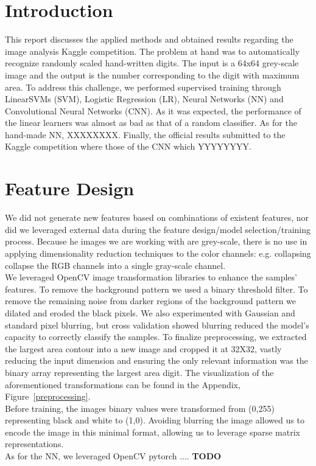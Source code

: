 \documentclass[10pt, hidelinks]{article}
\begin{document}
\section*{Introduction}

This report discusses the applied methods and obtained results regarding the image analysis Kaggle competition. The problem at hand was to automatically recognize randomly scaled hand-written digits. The input is a 64x64 grey-scale image and the output is the number corresponding to the digit with maximum area. To address this challenge, we performed supervised training through LinearSVMs (SVM), Logistic Regression (LR), Neural Networks (NN) and Convolutional Neural Networks (CNN). As it was expected, the performance of the linear learners was almost as bad as that of a random classifier. As for the hand-made NN, XXXXXXXX. Finally, the official results submitted to the Kaggle competition where those of the CNN which YYYYYYYY.

\section*{Feature Design}


We did not generate new features based on combinations of existent features, nor did we leveraged external data during the feature design/model selection/training process. Because he images we are working with are grey-scale, there is no use in applying dimensionality reduction techniques to the color channels: e.g. collapsing collapse the RGB channels into a single gray-scale channel.\\
\noindent We leveraged OpenCV image transformation libraries to enhance the samples' features. To remove the background pattern we used a binary threshold filter. To remove the remaining noise from darker regions of the background pattern we dilated and eroded the black pixels. We also experimented with Gaussian and standard pixel blurring, but cross validation showed blurring reduced the model's capacity to correctly classify the samples. To finalize preprocessing, we extracted the largest area contour into a new image and cropped it at 32X32, vastly reducing the input dimension and ensuring the only relevant information was the binary array representing the largest area digit. The visualization of the aforementioned transformations can be found in the Appendix, Figure~\ref{preprocessing}.\\
\noindent Before training, the images binary values were transformed from (0,255) representing black and white to (1,0). Avoiding blurring the image allowed us to encode the image in this minimal format, allowing us to leverage sparse matrix representations.\\
\noindent As for the NN, we leveraged OpenCV pytorch  .... \textbf{TODO}
\end{document}
